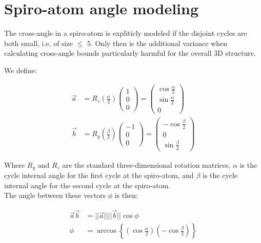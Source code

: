 \documentclass[a4paper]{article}
\begin{document}
\small

\newcommand{\posVecDiff}[2]{
  \left( \vec{r}_{#1} - \vec{r}_{#2} \right)
}

\newcommand{\vecDiff}[2]{
  \left( \vec{#1} - \vec{#2}\,\right)
}

\newcommand{\vecCross}[2]{
  \left( \vec{#1} \times \vec{#2}\,\right)
}

\newcommand{\posDependence}{
  \left( \left\{\vec{r}_i \right\} \right)
}

\newcommand{\distanceErrorFirstTermPart}{
  \frac{
    \posVecDiff{j}{i}^{2}
  }{
    U_{ij}^{2}
  } - 1
}

\section{Spiro-atom angle modeling}

The cross-angle in a spiro-atom is expliticly modeled if the disjoint cycles are
both small, i.e. of size $\le$ 5. Only then is the additional variance when
calculating cross-angle bounds particularly harmful for the overall 3D
structure.

We define:

\begin{align}
  \vec{a} &= R_z\left(\frac{\alpha}{2}\right)\begin{pmatrix}
    1\\
    0\\
    0
  \end{pmatrix} = \begin{pmatrix}
    \cos \frac{\alpha}{2}\\
    \sin \frac{\alpha}{2}\\
    0
  \end{pmatrix}\\
  \vec{b} &= R_y\left(\frac{\beta}{2}\right)\begin{pmatrix}
    -1\\
    0\\
    0
  \end{pmatrix} = \begin{pmatrix}
    - \cos \frac{\beta}{2}\\
    0\\
    \sin \frac{\beta}{2}
  \end{pmatrix}
\end{align}

Where $R_y$ and $R_z$ are the standard three-dimensional rotation matrices,
$\alpha$ is the cycle internal angle for the first cycle at the spiro-atom, and
$\beta$ is the cycle internal angle for the second cycle at the spiro-atom.\\

The angle between these vectors $\phi$ is then:

\begin{align}
  \vec{a}\vec{b} &= ||\vec{a}||||\vec{b}|| \cos \phi\\
  \phi &= \arccos \left\{ 
    \left(\cos \frac{\alpha}{2} \right)
    \left(- \cos \frac{\beta}{2} \right)
  \right\}
\end{align}
\end{document}
